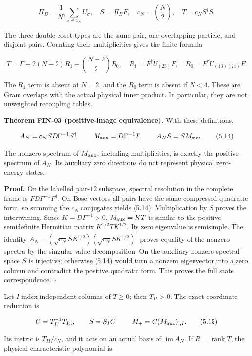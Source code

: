 \documentclass[a4paper,11pt]{article}
\numberwithin{equation}{section}
\begin{document}
\[
\Pi_B=\frac1{N!}\sum_{\sigma\in S_N}U_\sigma,
\quad S=\Pi_BF,\quad c_N=\binom N2,
\quad T=c_NS^\dagger S.
\tag{5.12}
\]

The three double-coset types are the same pair, one overlapping particle, and disjoint pairs. Counting their multiplicities gives the finite formula

\[
T=\Gamma+2(N-2)R_1+\binom{N-2}{2}R_0,
\quad
R_1=F^\dagger U_{(23)}F,
\quad R_0=F^\dagger U_{(13)(24)}F.
\tag{5.13}
\]

The \(R_1\) term is absent at \(N=2\), and the \(R_0\) term is absent if \(N<4\). These are Gram overlaps with the actual physical inner product. In particular, they are not unweighted recoupling tables.

\textbf{Theorem FIN-03 (positive-image equivalence).} With these definitions,

\[
A_N=c_NS D\Gamma^{-1}S^\dagger,
\qquad M_{\rm aux}=D\Gamma^{-1}T,
\qquad A_NS=SM_{\rm aux}.
\tag{5.14}
\]

The nonzero spectrum of \(M_{\rm aux}\), including multiplicities, is exactly the positive spectrum of \(A_N\). Its auxiliary zero directions do not represent physical zero-energy states.

\textbf{Proof.} On the labelled pair-\(12\) subspace, spectral resolution in the complete frame is \(FD\Gamma^{-1}F^\dagger\). On Bose vectors all pairs have the same compressed quadratic form, so summing the \(c_N\) conjugates yields (5.14). Multiplication by \(S\) proves the intertwining. Since \(K=D\Gamma^{-1}>0\), \(M_{\rm aux}=KT\) is similar to the positive semidefinite Hermitian matrix \(K^{1/2}TK^{1/2}\). Its zero eigenvalue is semisimple. The identity \(A_N=(\sqrt{c_N}SK^{1/2})(\sqrt{c_N}SK^{1/2})^\dagger\) proves equality of the nonzero spectra by the singular-value decomposition. On the auxiliary nonzero spectral space \(S\) is injective; otherwise (5.14) would turn a nonzero eigenvector into a zero column and contradict the positive quadratic form. This proves the full state correspondence. \(\square\)

Let \(I\) index independent columns of \(T\ge0\); then \(T_{II}>0\). The exact coordinate reduction is

\[
C=T_{II}^{-1}T_{I,:},\qquad
S=S_I C,\qquad
M_+=C(M_{\rm aux})_{:,I}.
\tag{5.15}
\]

Its metric is \(T_{II}/c_N\), and it acts on an actual basis of \(\operatorname{im}A_N\). If \(R=\operatorname{rank}T\), the physical characteristic polynomial is
\end{document}
